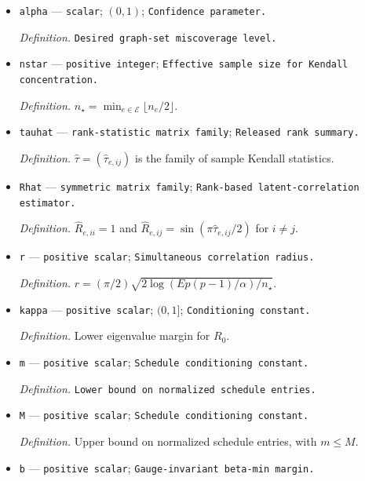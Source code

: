 \documentclass{article}
\begin{document}
\begin{itemize}
  \par\smallskip\noindent\emph{Definition.} Independent site samples whose Gaussian copulas have latent correlations \(R_e\).
  \item \texttt{alpha} --- \texttt{scalar}; \((0,1)\); \texttt{Confidence parameter.}
  \par\smallskip\noindent\emph{Definition.} \texttt{Desired graph-\allowbreak{}set miscoverage level.}
  \item \texttt{nstar} --- \texttt{positive integer}; \texttt{Effective sample size for Kendall concentration.}
  \par\smallskip\noindent\emph{Definition.} \(n_{\star}=\min_{e\in\mathcal E}\lfloor n_e/2\rfloor\).
  \item \texttt{tauhat} --- \texttt{rank-\allowbreak{}statistic matrix family}; \texttt{Released rank summary.}
  \par\smallskip\noindent\emph{Definition.} \(\widehat\tau=(\widehat\tau_{e,ij})\) is the family of sample Kendall statistics.
  \item \texttt{Rhat} --- \texttt{symmetric matrix family}; \texttt{Rank-\allowbreak{}based latent-\allowbreak{}correlation estimator.}
  \par\smallskip\noindent\emph{Definition.} \(\widehat R_{e,ii}=1\) and \(\widehat R_{e,ij}=\sin(\pi\widehat\tau_{e,ij}/2)\) for \(i\ne j\).
  \item \texttt{r} --- \texttt{positive scalar}; \texttt{Simultaneous correlation radius.}
  \par\smallskip\noindent\emph{Definition.} \(r=(\pi/2)\sqrt{2\log(Ep(p-1)/\alpha)/n_{\star}}\).
  \item \texttt{kappa} --- \texttt{positive scalar}; \((0,1]\); \texttt{Conditioning constant.}
  \par\smallskip\noindent\emph{Definition.} Lower eigenvalue margin for \(R_0\).
  \item \texttt{m} --- \texttt{positive scalar}; \texttt{Schedule conditioning constant.}
  \par\smallskip\noindent\emph{Definition.} \texttt{Lower bound on normalized schedule entries.}
  \item \texttt{M} --- \texttt{positive scalar}; \texttt{Schedule conditioning constant.}
  \par\smallskip\noindent\emph{Definition.} Upper bound on normalized schedule entries, with \(m\le M\).
  \item \texttt{b} --- \texttt{positive scalar}; \texttt{Gauge-\allowbreak{}invariant beta-\allowbreak{}min margin.}

\end{itemize}
\end{document}
